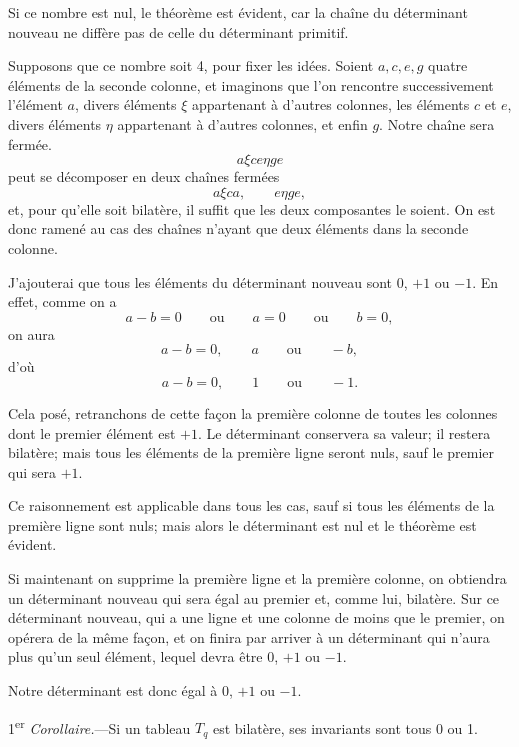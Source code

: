 \documentclass{article}
\begin{document}
Si ce nombre est nul, le théorème est évident, car la chaîne du déterminant nouveau ne diffère pas de celle du déterminant primitif.

Supposons que ce nombre soit 4, pour fixer les idées. Soient $a, c, e, g$ quatre éléments de la seconde colonne, et imaginons que l'on rencontre successivement l'élément $a$, divers éléments $\xi$ appartenant à d'autres colonnes, les éléments $c$ et $e$, divers éléments $\eta$ appartenant à d'autres colonnes, et enfin $g$. Notre chaîne sera fermée.
\[ a\xi ce\eta ge \]
peut se décomposer en deux chaînes fermées
\[ a\xi ca, \qquad e\eta ge, \]
et, pour qu'elle soit bilatère, il suffit que les deux composantes le soient. On est donc ramené au cas des chaînes n'ayant que deux éléments dans la seconde colonne.

J'ajouterai que tous les éléments du déterminant nouveau sont 0, $+1$ ou $-1$. En effet, comme on a
\[ a-b = 0 \qquad \text{ou} \qquad a = 0 \qquad \text{ou} \qquad b = 0, \]
on aura
\[ a-b = 0, \qquad a \qquad \text{ou} \qquad -b, \]
d'où
\[ a-b = 0, \qquad 1 \qquad \text{ou} \qquad -1. \]

Cela posé, retranchons de cette façon la première colonne de toutes les colonnes dont le premier élément est $+1$. Le déterminant conservera sa valeur; il restera bilatère; mais tous les éléments de la première ligne seront nuls, sauf le premier qui sera $+1$.

Ce raisonnement est applicable dans tous les cas, sauf si tous les éléments de la première ligne sont nuls; mais alors le déterminant est nul et le théorème est évident.

Si maintenant on supprime la première ligne et la première colonne, on obtiendra un déterminant nouveau qui sera égal au premier et, comme lui, bilatère. Sur ce déterminant nouveau, qui a une ligne et une colonne de moins que le premier, on opérera de la même façon, et on finira par arriver à un déterminant qui n'aura plus qu'un seul élément, lequel devra être 0, $+1$ ou $-1$.

Notre déterminant est donc égal à 0, $+1$ ou $-1$.

1\textsuperscript{er} \emph{Corollaire.}---Si un tableau $T_{q}$ est bilatère, ses invariants sont tous 0 ou 1.
\end{document}
